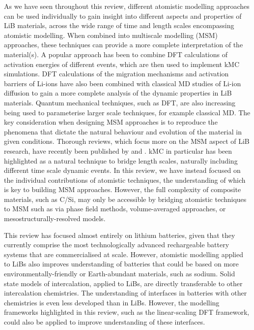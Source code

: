 \documentclass[../main.tex]{subfiles}
\begin{document}
As we have seen throughout this review, different atomistic modelling approaches can be used individually to gain insight into different aspects and properties of LiB materials, across the wide range of time and length scales encompassing atomistic modelling. When combined into multiscale modelling (MSM) approaches, these techniques can provide a more complete interpretation of the material(s).\cite{franco2013multiscale,franco2019,Shi_2016} A popular approach has been to combine DFT calculations of activation energies of different events, which are then used to implement kMC simulations.\cite{Gavil_n_Arriazu_2021_kmc} DFT calculations of the migration mechanisms and activation barriers of Li-ions have also been combined with classical MD studies of Li-ion diffusion to gain a more complete analysis of the dynamic properties in LiB materials.\cite{vicent2016quantum,choi2017interfacial} Quantum mechanical techniques, such as DFT, are also increasing being used to parameterise larger scale techniques, for example classical MD.\cite{Morgan2021PopOff,Stukowski_2017,dftfit,wen_kim-compliant_2017,deringer2019machine} The key consideration when designing MSM approaches is to reproduce the phenomena that dictate the natural behaviour and evolution of the material in given conditions. Thorough reviews, which focus more on the MSM aspect of LiB research, have recently been published by \citeauthor{franco2019}\cite{franco2019} and \citeauthor{Shi_2016}.\cite{Shi_2016} kMC in particular has been highlighted as a natural technique to bridge length scales, naturally including different time scale dynamic events.\cite{Gavil_n_Arriazu_2021_kmc} In this review, we have instead focused on the individual contributions of atomistic techniques, the understanding of which is key to building MSM approaches. However, the full complexity of composite materials, such as C/Si, may only be accessible by bridging atomistic techniques to MSM such as via phase field methods, volume-averaged approaches, or mesostructurally-resolved models.\cite{franco2019,Bazant2017,franco2013multiscale,Shi_2016}

This review has focused almost entirely on lithium batteries, given that they currently comprise the most technologically advanced rechargeable battery systems that are commercialised at scale. However, atomistic modelling applied to LiBs also improves understanding of batteries that could be based on more environmentally-friendly or Earth-abundant materials, such as sodium. Solid state models of intercalation, applied to LiBs, are directly transferable to other intercalation chemistries. The understanding of interfaces in batteries with other chemistries is even less developed than in LiBs. However, the modelling frameworks highlighted in this review, such as the linear-scaling DFT framework, could also be applied to improve understanding of these interfaces.
\end{document}
